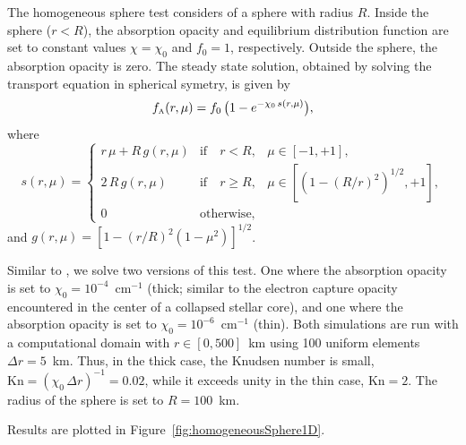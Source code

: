 \documentclass[10pt,preprint]{aastex}
\begin{document}
The homogeneous sphere test \citep[cf.][]{smit_etal_1997} considers of a sphere with radius $R$.  
Inside the sphere ($r<R$), the absorption opacity and equilibrium distribution function are set to constant values $\chi=\chi_{0}$ and $f_{0}=1$, respectively.  
Outside the sphere, the absorption opacity is zero.  
The steady state solution, obtained by solving the transport equation in spherical symetry, is given by
\begin{equation}
  f_{\mbox{\tiny A}}(r,\mu)=f_{0}\,\big(1-e^{-\chi_{0}\,s(r,\mu)}\big),
  \label{distributionHomogeneousSphere}
\end{equation}
where
\begin{equation}
  s(r,\mu)
  =\left\{
  \begin{array}{lll}
    r\,\mu+R\,g(r,\mu) & \mbox{if}\quad r<R, & \mu\in[-1,+1], \\
    2\,R\,g(r,\mu) & \mbox{if}\quad r \ge R, & \mu\in[(1-(R/r)^{2})^{1/2},+1], \\
    0 & \mbox{otherwise},
  \end{array}
  \right.
\end{equation}
and $g(r,\mu)=[1-(r/R)^{2}(1-\mu^{2})]^{1/2}$.  

Similar to \citet{oConnor_2015}, we solve two versions of this test.  
One where the absorption opacity is set to $\chi_{0}=10^{-4}$~cm$^{-1}$ (thick; similar to the electron capture opacity encountered in the center of a collapsed stellar core), and one where the absorption opacity is set to $\chi_{0}=10^{-6}$~cm$^{-1}$ (thin).  
Both simulations are run with a computational domain with $r\in[0,500]$~km using 100 uniform elements $\Delta r=5$~km.  
Thus, in the thick case, the Knudsen number is small, $\mbox{Kn}=(\chi_{0}\,\Delta r)^{-1}=0.02$, while it exceeds unity in the thin case, $\mbox{Kn}=2$.  
The radius of the sphere is set to $R=100$~km.  

Results are plotted in Figure~\ref{fig:homogeneousSphere1D}.  
\end{document}
